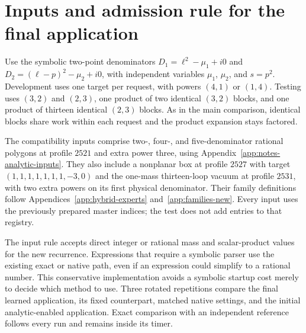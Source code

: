 \section{Inputs and admission rule for the final application}
\label{app:notes-parser-guard}
Use the symbolic two-point denominators $D_1=\ell^2-\mu_1+i0$ and $D_2=(\ell-p)^2-\mu_2+i0$, with independent variables $\mu_1$, $\mu_2$, and $s=p^2$. Development uses one target per request, with powers $(4,1)$ or $(1,4)$. Testing uses $(3,2)$ and $(2,3)$, one product of two identical $(3,2)$ blocks, and one product of thirteen identical $(2,3)$ blocks. As in the main comparison, identical blocks share work within each request and the product expansion stays factored.

The compatibility inputs comprise two-, four-, and five-denominator rational polygons at profile $2521$ and extra power three, using Appendix~\ref{app:notes-analytic-inputs}. They also include a nonplanar box at profile $2527$ with target $(1,1,1,1,1,1,1,-3,0)$ and the one-mass thirteen-loop vacuum at profile $2531$, with two extra powers on its first physical denominator. Their family definitions follow Appendices~\ref{app:hybrid-experts} and~\ref{app:families-new}. Every input uses the previously prepared master indices; the test does not add entries to that registry.

The input rule accepts direct integer or rational mass and scalar-product values for the new recurrence. Expressions that require a symbolic parser use the existing exact or native path, even if an expression could simplify to a rational number. This conservative implementation avoids a symbolic startup cost merely to decide which method to use. Three rotated repetitions compare the final learned application, its fixed counterpart, matched native settings, and the initial analytic-enabled application. Exact comparison with an independent reference follows every run and remains inside its timer.
